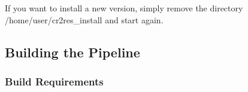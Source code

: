 If you want to install a new version, simply remove the directory
/home/user/cr2res\_install and start again.






\subsection{Building the \instrument{} Pipeline}
\label{sec:compile-howto}

\subsubsection{Build Requirements}
\label{sec:compile-requirements}

